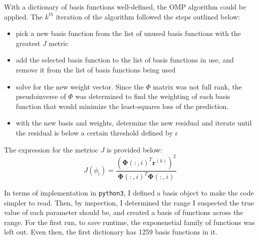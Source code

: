 \documentclass{article}
\begin{document}
With a dictionary of basis functions well-defined, the OMP algorithm could be applied. The $k^{th}$ iteration of the algorithm followed the steps outlined below:

\begin{itemize}
\item pick a new basis function from the list of unused basis functions with the greatest $J$ metric
\item add the selected basis function to the list of basis functions in use, and remove it from the list of basis functions being used
\item solve for the new weight vector. Since the $\Phi$ matrix was not full rank, the pseudoinverse of $\Phi$ was determined to find the weighting of each basis function that would minimize the least-squares loss of the prediction.
\item with the new basis and weights, determine the new residual and iterate until the residual is below a certain threshold defined by $\epsilon$
\end{itemize}

The expression for the metrioc $J$ is provided below:
\begin{equation}
J(\phi_i) = \frac{(\mathbf{\Phi}(:,i)^T\mathbf{r}^{(k)})^2}{\mathbf{\Phi}(:,i)^T\mathbf{\Phi}(:,i)}
\end{equation}

In terms of implementation in \verb+python3+, I defined a basis object to make the code simpler to read. Then, by inspection, I determined the range I suspected the true value of each parameter should be, and created a basis of functions across the range. For the first run, to save runtime, the exponenetial family of functions was left out. Even then, the first dictionary has 1259 basis functions in it.
\end{document}
